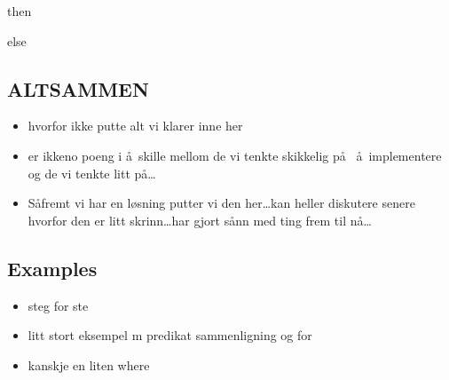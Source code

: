 then

else

\subsection{ALTSAMMEN}
\begin{itemize}
  \item hvorfor ikke putte alt vi klarer inne her
  \item er ikkeno poeng i \aa~skille mellom de vi tenkte skikkelig p\aa~ \aa~implementere og de vi tenkte litt
  p\aa\ldots
  \item S\aa fremt vi har en l\o sning putter vi den her\ldots kan heller diskutere senere hvorfor den er litt
  skrinn\ldots har gjort s\aa nn med ting frem til n\aa\ldots
\end{itemize}

\subsection{Examples}
\label{sect:translation:mXr:markxremoveExamples}
\begin{itemize}
\item steg for ste
\item litt stort eksempel m predikat sammenligning og for
\item kanskje en liten where
\end{itemize}
